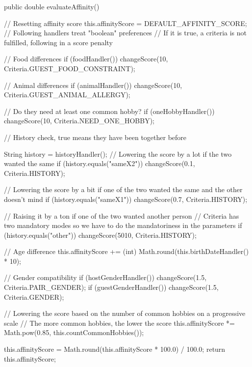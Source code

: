 \documentclass{mytex}
\begin{document}
\begin{codebox}
public double evaluateAffinity() {
	// Resetting affinity score
	this.affinityScore = DEFAULT_AFFINITY_SCORE; 
	// Following handlers treat "boolean" preferences
	// If it is true, a criteria is not fulfilled, following in a score penalty
	
	// Food differences
	if (foodHandler()) changeScore(10, Criteria.GUEST_FOOD_CONSTRAINT);
	
	// Animal differences
	if (animalHandler()) changeScore(10, Criteria.GUEST_ANIMAL_ALLERGY);
	
	// Do they need at least one common hobby?
	if (oneHobbyHandler()) changeScore(10, Criteria.NEED_ONE_HOBBY);
	
	// History check, true means they have been together before

	String history = historyHandler();
	// Lowering the score by a lot if the two wanted the same
	if (history.equals("sameX2")) changeScore(0.1, Criteria.HISTORY);
	
	// Lowering the score by a bit if one of the two wanted the same and the other doesn't mind
	if (history.equals("sameX1")) changeScore(0.7, Criteria.HISTORY);
	
	// Raising it by a ton if one of the two wanted another person
	// Criteria has two mandatory modes so we have to do the mandatoriness in the parameters 
	if (history.equals("other")) changeScore(5010, Criteria.HISTORY);

	// Age difference
	this.affinityScore += (int) Math.round(this.birthDateHandler() * 10);
	
	// Gender compatibility
	if (hostGenderHandler()) changeScore(1.5, Criteria.PAIR_GENDER);
	if (guestGenderHandler()) changeScore(1.5, Criteria.GENDER);
	
	// Lowering the score based on the number of common hobbies on a progressive scale
	// The more common hobbies, the lower the score
	this.affinityScore *= Math.pow(0.85, this.countCommonHobbies());
	
	this.affinityScore = Math.round(this.affinityScore * 100.0) / 100.0;
	return this.affinityScore;
}
\end{codebox}


\end{document}
